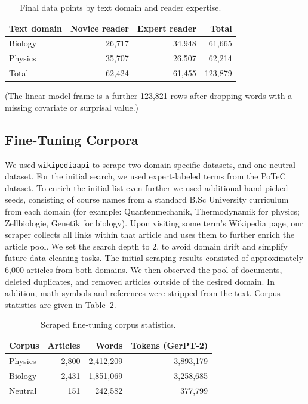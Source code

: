 \documentclass[10pt,letterpaper]{article}
\begin{document}
\begin{table}[H]
  \begin{center}
    \caption{Final data points by text domain and reader expertise.}
    \label{tab:breakdown}
    \vskip 0.12in
    \small
    \begin{tabular}{lrrr}
      \hline
      Text domain & Novice reader & Expert reader & Total \\
      \hline
      Biology & 26,717 & 34,948 & 61,665 \\
      Physics & 35,707 & 26,507 & 62,214 \\
      Total & 62,424 & 61,455 & 123,879 \\
      \hline
    \end{tabular}
  \end{center}
\end{table}

(The linear-model frame is a further 123,821 rows after dropping words with a missing covariate or surprisal value.)

\subsection{Fine-Tuning Corpora}

We used \texttt{wikipediaapi} to scrape two domain-specific datasets, and one neutral dataset.
For the initial search, we used expert-labeled terms from the PoTeC dataset. To enrich the initial list even further we used additional hand-picked seeds, consisting of course names from a standard B.Sc University curriculum from each domain (for example: Quantenmechanik, Thermodynamik for physics; Zellbiologie, Genetik for biology).
Upon visiting some term's Wikipedia page, our scraper collects all links within that article and uses them to further enrich the article pool.
We set the search depth to 2, to avoid domain drift and simplify future data cleaning tasks.
The initial scraping results consisted of approximately 6,000 articles from both domains. We then observed the pool of documents, deleted duplicates, and removed articles outside of the desired domain. In addition, math symbols and references were stripped from the text. Corpus statistics are given in Table~\ref{tab:corpora}.

\begin{table}[H]
  \begin{center}
    \caption{Scraped fine-tuning corpus statistics.}
    \label{tab:corpora}
    \vskip 0.12in
    \small
    \begin{tabular}{lrrr}
      \hline
      Corpus & Articles & Words & Tokens (GerPT-2) \\
      \hline
      Physics & 2,800 & 2,412,209 & 3,893,179 \\
      Biology & 2,431 & 1,851,069 & 3,258,685 \\
      Neutral & 151 & 242,582 & 377,799 \\
      \hline
    \end{tabular}
  \end{center}
\end{table}
\end{document}
